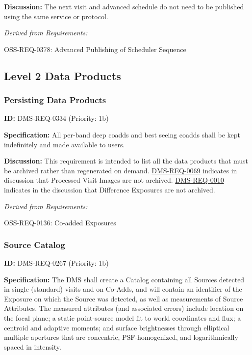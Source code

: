 \documentclass[SE,toc,lsstdraft]{lsstdoc}
\begin{document}
\textbf{Discussion:}
The next visit and advanced schedule do not need to be published using the same service or protocol.

\emph{Derived from Requirements:}

OSS-REQ-0378:
Advanced Publishing of Scheduler Sequence \newline

\subsection{Level 2 Data Products}

\subsubsection{Persisting Data Products}

\label{DMS-REQ-0334}
\textbf{ID:} DMS-REQ-0334 (Priority: 1b)

\textbf{Specification:}
All per-band deep coadds and best seeing coadds shall be kept indefinitely and made available to users.

\textbf{Discussion:} This requirement is intended to list all the data products that must be archived rather than regenerated on demand. \hyperref[DMS-REQ-0069]{DMS-REQ-0069} indicates in discussion that Processed Visit Images are not archived. \hyperref[DMS-REQ-0010]{DMS-REQ-0010} indicates in the discussion that Difference Exposures are not archived.

\emph{Derived from Requirements:}

OSS-REQ-0136:
Co-added Exposures \newline

\subsubsection{Source Catalog}

\label{DMS-REQ-0267}
\textbf{ID:} DMS-REQ-0267 (Priority: 1b)

\textbf{Specification:} The DMS shall create a Catalog containing all Sources detected in single (standard) visits and on Co-Adds, and will contain an identifier of the Exposure on which the Source was detected, as well as measurements of Source Attributes. The measured attributes (and associated errors) include location on the focal plane; a static point-source model fit to world coordinates and flux; a centroid and adaptive moments; and surface brightnesses through elliptical multiple apertures that are concentric, PSF-homogenized, and logarithmically spaced in intensity.
\end{document}
